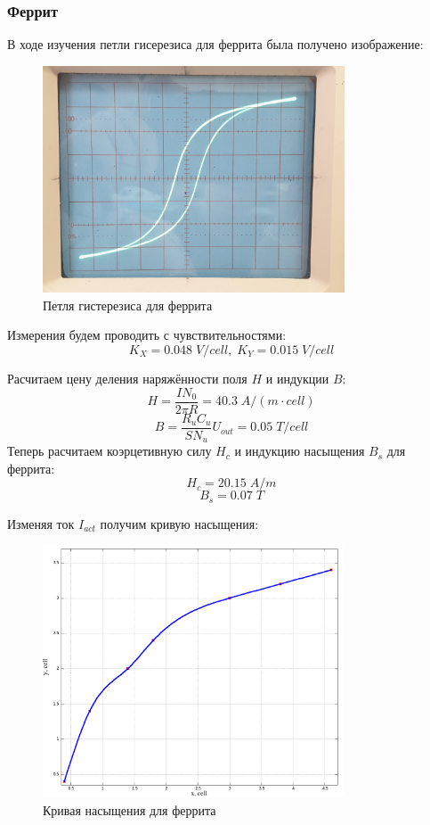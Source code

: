 \documentclass{article}
\begin{document}
\subsubsection{Феррит}
В ходе изучения петли гисерезиса для феррита была получено изображение:
\begin{figure}[H]
    \centering
    \includegraphics[width = 0.8\textwidth]{3-1.jpg}
    \caption{Петля гистерезиса для феррита}
\end{figure}

Измерения будем проводить с чувствительностями:
\[ K_X = 0.048\; V/cell,\; K_Y = 0.015\; V/cell  \]

Расчитаем цену деления наряжённости поля $H$ и индукции $B$:
\[ H = \frac{IN_0}{2\pi R} = 40.3\; A/(m\cdot cell) \]
\[ B = \frac{R_uC_u}{SN_u}U_{out} = 0.05\; T/cell \]
Теперь расчитаем коэрцетивную силу $H_c$ и индукцию насыщения $B_s$ для феррита:
\[ H_c = 20.15\; A/m \]
\[ B_s = 0.07\; T \]

Изменяя ток $I_{act}$ получим кривую насыщения:
\begin{figure}[H]
    \centering
    \includegraphics[width = 0.8\textwidth]{3-d.png}
    \caption{Кривая насыщения для феррита}
\end{figure}
\end{document}
